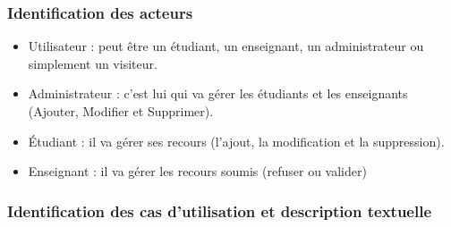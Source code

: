 \documentclass[12pt]{report}
\begin{document}
\vspace*{-0.3in}

\subsubsection{Identification des acteurs}

\begin{itemize}
\item Utilisateur : peut être un étudiant, un enseignant, un administrateur ou simplement un visiteur.
\item Administrateur : c'est lui qui va gérer les étudiants et les enseignants (Ajouter, Modifier et Supprimer).
\item Étudiant : il va gérer ses recours (l'ajout, la modification et la suppression).
\item Enseignant : il va gérer les recours soumis (refuser ou valider)
\end{itemize}

\newpage

\subsubsection{Identification des cas d'utilisation et description textuelle}
\end{document}
